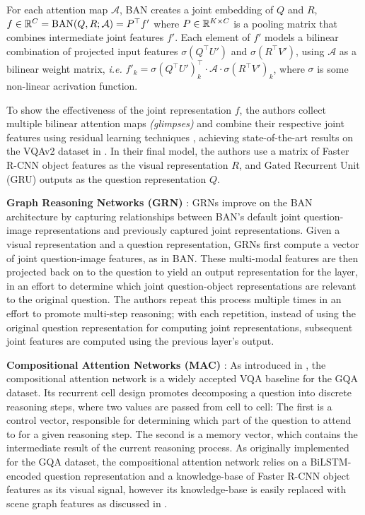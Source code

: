 For each attention map \(\mathcal{A}\), BAN creates a joint embedding of \(Q\) and \(R\), \(f \in \mathbb{R}^C = \text{BAN}(Q, R; \mathcal{A}) = P^\top f'\) where \(P \in \mathbb{R}^{K \times C}\) is a pooling matrix that combines intermediate joint features \(f'\). Each element of \(f'\) models a bilinear combination of projected input features \(\sigma (Q^\top U')\) and \(\sigma (R^\top V')\), using \(\mathcal{A}\) as a bilinear weight matrix, \textit{i.e.} \(f'_k = \sigma (Q^\top U')^\top_k \cdot \mathcal{A} \cdot \sigma (R^\top V')_k\), where \(\sigma\) is some non-linear acrivation function.

To show the effectiveness of the joint representation \(f\), the authors collect multiple bilinear attention maps \textit{(glimpses)} and combine their respective joint features using residual learning techniques \cite{kim2016multimodal}, achieving state-of-the-art results on the VQAv2 dataset in \citeyear{kim2018bilinear}. In their final model, the authors use a matrix of Faster R-CNN object features as the visual representation \(R\), and Gated Recurrent Unit (GRU) \cite{cho2014learning} outputs as the question representation \(Q\).

\textbf{Graph Reasoning Networks (GRN)} \cite{guo2019bilinear}: GRNs improve on the BAN architecture by capturing relationships between BAN's default joint question-image representations and previously captured joint representations. Given a visual representation and a question representation, GRNs first compute a vector of joint question-image features, as in BAN. These multi-modal features are then projected back on to the question to yield an output representation for the layer, in an effort to determine which joint question-object representations are relevant to the original question. The authors repeat this process multiple times in an effort to promote multi-step reasoning; with each repetition, instead of using the original question representation for computing joint representations, subsequent joint features are computed using the previous layer's output.


\textbf{Compositional Attention Networks (MAC)} \cite{hudson2018compositional}: As introduced in \subsectionautorefname{ \ref{subsection:attention_methods_for_vqa}}, the compositional attention network is a widely accepted VQA baseline for the GQA dataset. Its recurrent cell design promotes decomposing a question into discrete reasoning steps, where two values are passed from cell to cell: The first is a control vector, responsible for determining which part of the question to attend to for a given reasoning step. The second is a memory vector, which contains the intermediate result of the current reasoning process. As originally implemented for the GQA dataset, the compositional attention network relies on a BiLSTM-encoded question representation and a knowledge-base of Faster R-CNN \cite{ren2016faster} object features as its visual signal, however its knowledge-base is easily replaced with scene graph features as discussed in \sectionautorefname{ \ref{section:performance_evaluation}}.

